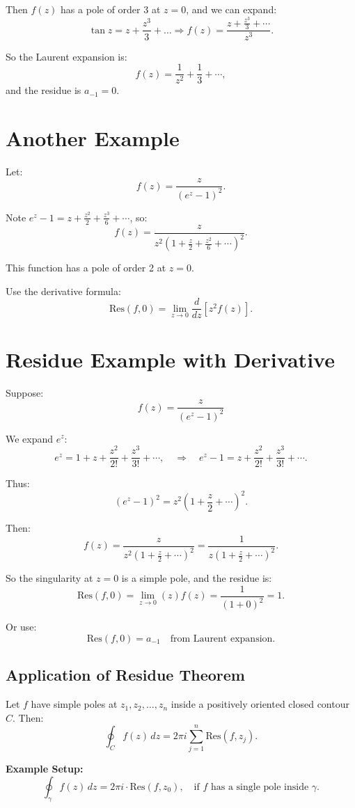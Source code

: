 \documentclass[12pt]{article}
\theoremstyle{definition} %
\theoremstyle{plain} %
\begin{document}
Then $f(z)$ has a pole of order 3 at $z = 0$, and we can expand:
\[
\tan z = z + \frac{z^3}{3} + \dots \Rightarrow f(z) = \frac{z + \frac{z^3}{3} + \cdots}{z^3}.
\]

So the Laurent expansion is:
\[
f(z) = \frac{1}{z^2} + \frac{1}{3} + \cdots,
\]
and the residue is $a_{-1} = 0$.

\section*{Another Example}

Let:
\[
f(z) = \frac{z}{(e^z - 1)^2}.
\]

Note $e^z - 1 = z + \frac{z^2}{2} + \frac{z^3}{6} + \cdots$, so:
\[
f(z) = \frac{z}{z^2 (1 + \frac{z}{2} + \frac{z^2}{6} + \cdots)^2}.
\]

This function has a pole of order 2 at $z = 0$.

Use the derivative formula:
\[
\text{Res}(f, 0) = \lim_{z \to 0} \frac{d}{dz} \left[ z^2 f(z) \right].
\]
\section*{Residue Example with Derivative}

Suppose:
\[
f(z) = \frac{z}{(e^z - 1)^2}
\]

We expand $e^z$:
\[
e^z = 1 + z + \frac{z^2}{2!} + \frac{z^3}{3!} + \cdots,
\quad \Rightarrow \quad e^z - 1 = z + \frac{z^2}{2!} + \frac{z^3}{3!} + \cdots.
\]

Thus:
\[
(e^z - 1)^2 = z^2 \left( 1 + \frac{z}{2} + \cdots \right)^2.
\]

Then:
\[
f(z) = \frac{z}{z^2 (1 + \frac{z}{2} + \cdots)^2}
= \frac{1}{z (1 + \frac{z}{2} + \cdots)^2}.
\]

So the singularity at $z = 0$ is a simple pole, and the residue is:
\[
\text{Res}(f, 0) = \lim_{z \to 0} (z) f(z) = \frac{1}{(1 + 0)^2} = 1.
\]

Or use:
\[
\text{Res}(f, 0) = a_{-1} \quad \text{from Laurent expansion.}
\]

\subsection*{Application of Residue Theorem}

Let $f$ have simple poles at $z_1, z_2, \dots, z_n$ inside a positively oriented closed contour $C$. Then:
\[
\oint_C f(z) \, dz = 2\pi i \sum_{j=1}^n \text{Res}(f, z_j).
\]

\textbf{Example Setup:}
\[
\oint_{\gamma} f(z)\, dz = 2\pi i \cdot \text{Res}(f, z_0),
\quad \text{if } f \text{ has a single pole inside } \gamma.
\]
\end{document}
